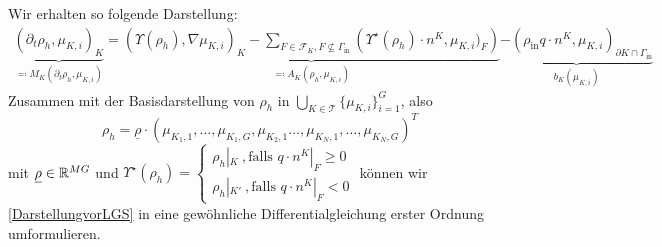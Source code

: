 Wir erhalten so folgende Darstellung:
\begin{align}
\label{DarstellungvorLGS}
\underbrace{\left(\partial_t \rho_h, \mu_{K,i}  \right)_{K}}_{\eqqcolon M_K(\partial_t \rho_{h}, \mu_{K,i})} = 
\underbrace{ \left(\Upsilon(\rho_h), \nabla\mu_{K,i}\right)_{K} -  \sum_{F \in \mathcal{F}_{K} , F \not \subseteq \Gamma_{\text{in}}}\left(\Upsilon^{\star}(\rho_h)\cdot n^{K},\mu_{K,i}\big)_F \right)}_{\eqqcolon A_K(\rho_{h},\mu_{K,i})} \underbrace{- \left(\rho_{\text{in}}q\cdot n^{K},\mu_{K,i} \right)_{\partial K \cap \Gamma_{\text{in}}}}_{b_K(\mu_{K,i})}
\end{align}
%
Zusammen mit der Basisdarstellung von $ \rho_h $ in $\bigcup_{K \in \mathcal{T}}\{\mu_{K,i}  \}_{i=1}^G$, also 
\[ \rho_h = \underline{\rho} \cdot (\mu_{K_1,1},\dots,\mu_{K_1,G},\mu_{K_2,1}\dots,\mu_{K_N,1},\dots,\mu_{K_N,G})^T\]
mit $ \underline{\rho}\in \mathbb{R}^{MG} $ und 
$ \Upsilon^{\star}(\rho_h) = 
\begin{cases} 
\rho_h|_K \ ,\text{falls } q\cdot n^K|_F \geq 0\\
\rho_{h}|_{K'} \ , \text{falls } q\cdot n^K|_F < 0
\end{cases} 
$
 können wir \ref{DarstellungvorLGS} in eine gewöhnliche Differentialgleichung erster Ordnung umformulieren. 

